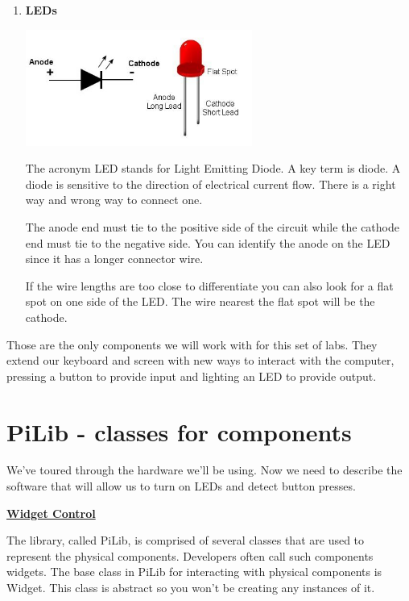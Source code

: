 \begin{enumerate}
\fi %

\item \textbf{LEDs}


\beforefig
\centerline{\includegraphics[height=1.50in]{pi_images/led_2.jpg}}
\afterfig

The acronym LED stands for Light Emitting Diode. A key term is diode. A diode is sensitive to the direction of electrical current flow. There is a right way and wrong way to connect one.

The anode end must tie to the positive side of the circuit while the cathode end must tie to the negative side. You can identify the anode on the LED since it has a longer connector wire. 

If the wire lengths are too close to differentiate you can also look for a flat spot on one side of the LED. The wire nearest the flat spot will be the cathode.


\end{enumerate}

Those are the only components we will work with for this set of labs. They extend our keyboard and screen with new ways to interact with the computer, pressing a button to provide input and lighting an LED to provide output.

\section{PiLib - classes for components}


We've toured through the hardware we'll be using. Now we need to describe the software that will allow us to turn on LEDs and detect button presses.

\textbf{\underline{Widget Control}} \newline

The library, called PiLib, is comprised of several classes that are used to represent the physical components. Developers often call such components widgets. The base class in PiLib for interacting with
physical components is Widget. This class is abstract so you won't be creating any instances of it.

